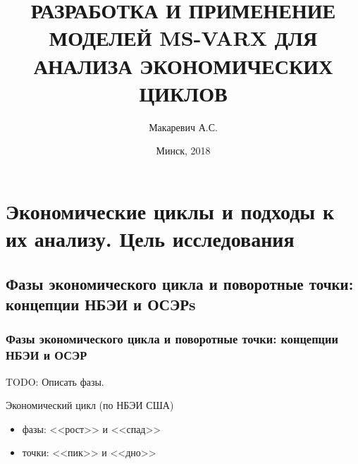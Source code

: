 \documentclass{beamer}
\title{РАЗРАБОТКА И ПРИМЕНЕНИЕ МОДЕЛЕЙ MS-VARX ДЛЯ АНАЛИЗА ЭКОНОМИЧЕСКИХ ЦИКЛОВ}
\author{Макаревич А.С.}
\institute[БГУ]{Белорусский Государственный Университет}
\date[Минск, 2018]{Минск, 2018}
\begin{document}
	\begin{frame}
		\titlepage
	\end{frame}

	\begin{frame}
		\tableofcontents[]
	\end{frame}

	\section{Экономические циклы и подходы к их анализу. Цель исследования}
		\subsection{Фазы экономического цикла и поворотные точки: концепции НБЭИ и ОСЭРs}
		\begin{frame}
			\frametitle{Фазы экономического цикла и поворотные точки: концепции НБЭИ и ОСЭР}
			
			TODO: Описать фазы.
			
			Экономический цикл (по НБЭИ США)
			\begin{itemize}
				\item фазы: <<рост>> и <<спад>>
				\item точки: <<пик>> и <<дно>>
			\end{itemize}
	
		\end{frame}
\end{document}
